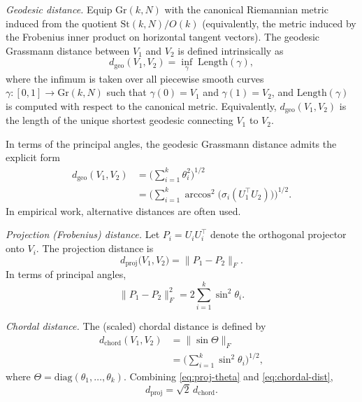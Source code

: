 \documentclass[twoside,11pt,letter]{article}
\begin{document}
\medskip\noindent
\emph{Geodesic distance.} Equip $\mathrm{Gr}(k,N)$ with the canonical Riemannian metric induced from the quotient $\mathrm{St}(k,N)/O(k)$ (equivalently, the metric induced by the Frobenius inner product on horizontal tangent vectors). The geodesic Grassmann distance between $V_1$ and $V_2$ is defined intrinsically as
\begin{equation}\label{eq:grass-dist-intrinsic}
d_\mathrm{{geo}}(V_1,V_2)=\inf_{\gamma}\; \mathrm{Length}(\gamma),
\end{equation}
where the infimum is taken over all piecewise smooth curves $\gamma:[0,1]\to \mathrm{Gr}(k,N)$ such that $\gamma(0)=V_1$ and $\gamma(1)=V_2$, and $\mathrm{Length}(\gamma)$ is computed with respect to the canonical metric. Equivalently, $d_\mathrm{{geo}}(V_1,V_2)$ is the length of the unique shortest geodesic connecting $V_1$ to $V_2$.

In terms of the principal angles, the geodesic Grassmann distance admits the explicit form
\begin{equation}\label{eq:grass-dist-theta}
\begin{split}
d_\mathrm{{geo}}(V_1,V_2)&=\Big(\sum_{i=1}^k \theta_i^2\Big)^{1/2}\\
&=\Big(\sum_{i=1}^k \arccos^2\!\bigl(\sigma_i(U_1^\top U_2)\bigr)\Big)^{1/2}.
\end{split}
\end{equation}
In empirical work, alternative distances are often used.

\medskip\noindent
\emph{Projection (Frobenius) distance.} Let $P_i = U_i U_i^\top$ denote the orthogonal projector onto $V_i$. The projection distance is
\begin{equation}\label{eq:proj-dist}
d_{\mathrm{proj}}\bigl(V_1,V_2\bigr) = \|P_1 - P_2\|_F.
\end{equation}
In terms of principal angles,
\begin{equation}\label{eq:proj-theta}
\|P_1 - P_2\|_F^2 =2 \sum_{i=1}^k \sin^2\theta_i.
\end{equation}

\medskip
\noindent
\emph{Chordal distance.} The (scaled) chordal distance is defined by
\begin{equation}\label{eq:chordal-dist}
\begin{split}
d_{\mathrm{chord}}(V_1,V_2)&=\|\sin \Theta\|_F\\
&=\Big( \sum_{i=1}^k \sin^2\theta_i \Big)^{1/2},
\end{split}
\end{equation}
where $\Theta=\mathrm{diag}(\theta_1,\ldots,\theta_k)$. Combining \eqref{eq:proj-theta} and \eqref{eq:chordal-dist},
\begin{equation*}
d_{\mathrm{proj}}=\sqrt{2}\, d_{\mathrm{chord}}.
\end{equation*}
\end{document}
